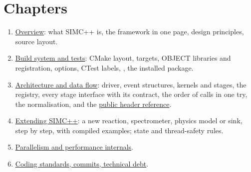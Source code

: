 \section*{\texorpdfstring{Chapters}{Chapters}}\label{developer_manual-index:chapters}
\begin{enumerate}
\item \hyperref[developer_manual-01u5foverview]{Overview}: what SIMC++ is, the framework in one page, design principles, source layout.
\item \hyperref[developer_manual-02u5fbuild]{Build system and tests}: CMake layout, targets, OBJECT libraries and registration,\allowbreak{} options, CTest
labels, , the installed package.
\item \hyperref[developer_manual-03u5farchitecture]{Architecture and data flow}: driver, event structures, kernels and stages, the registry,
every stage interface with its contract, the order of calls in one try, the normalisation,\allowbreak{} and the
\hyperref[developer_manual-03u5farchitecture:39-public-header-reference]{public header reference}.
\item \hyperref[developer_manual-04u5fextending]{Extending SIMC++}: a new reaction, spectrometer,\allowbreak{} physics model or sink, step by step, with compiled
examples; state and thread-safety rules.
\item \hyperref[developer_manual-05u5fparallel]{Parallelism and performance internals}.
\item \hyperref[developer_manual-06u5fstandards]{Coding standards, commits, technical debt}.
\end{enumerate}
